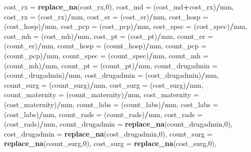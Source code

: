 \documentclass[]{article}
\newenvironment{Shaded}{\begin{snugshade}}{\end{snugshade}}
\newcommand{\KeywordTok}[1]{\textcolor[rgb]{0.13,0.29,0.53}{\textbf{#1}}}
\newcommand{\DataTypeTok}[1]{\textcolor[rgb]{0.13,0.29,0.53}{#1}}
\newcommand{\DecValTok}[1]{\textcolor[rgb]{0.00,0.00,0.81}{#1}}
\newcommand{\OperatorTok}[1]{\textcolor[rgb]{0.81,0.36,0.00}{\textbf{#1}}}
\newcommand{\NormalTok}[1]{#1}
\begin{document}
\begin{Shaded}
\begin{Highlighting}[]
{{{{{{       \DataTypeTok{cost_rx =} \KeywordTok{replace_na}\NormalTok{(cost_rx,}\DecValTok{0}\NormalTok{),}
       \DataTypeTok{cost_md =}\NormalTok{ (cost_md}\OperatorTok{+}\NormalTok{cost_rx)}\OperatorTok{/}\NormalTok{mm,}
       \DataTypeTok{cost_rx =}\NormalTok{ (cost_rx)}\OperatorTok{/}\NormalTok{mm, }
       \DataTypeTok{cost_er =}\NormalTok{ (cost_er)}\OperatorTok{/}\NormalTok{mm,}
       \DataTypeTok{cost_hosp =}\NormalTok{ (cost_hosp)}\OperatorTok{/}\NormalTok{mm,}
       \DataTypeTok{cost_pcp =}\NormalTok{ (cost_pcp)}\OperatorTok{/}\NormalTok{mm,}
       \DataTypeTok{cost_spec =}\NormalTok{ (cost_spec)}\OperatorTok{/}\NormalTok{mm,}
       \DataTypeTok{cost_mh =}\NormalTok{ (cost_mh)}\OperatorTok{/}\NormalTok{mm,}
       \DataTypeTok{cost_pt =}\NormalTok{ (cost_pt)}\OperatorTok{/}\NormalTok{mm,}
       \DataTypeTok{count_er =}\NormalTok{ (count_er)}\OperatorTok{/}\NormalTok{mm,}
       \DataTypeTok{count_hosp =}\NormalTok{ (count_hosp)}\OperatorTok{/}\NormalTok{mm,}
       \DataTypeTok{count_pcp =}\NormalTok{ (count_pcp)}\OperatorTok{/}\NormalTok{mm,}
       \DataTypeTok{count_spec =}\NormalTok{ (count_spec)}\OperatorTok{/}\NormalTok{mm,}
       \DataTypeTok{count_mh =}\NormalTok{ (count_mh)}\OperatorTok{/}\NormalTok{mm,}
       \DataTypeTok{count_pt =}\NormalTok{ (count_pt)}\OperatorTok{/}\NormalTok{mm,}
       \DataTypeTok{count_drugadmin =}\NormalTok{ (count_drugadmin)}\OperatorTok{/}\NormalTok{mm,}
       \DataTypeTok{cost_drugadmin =}\NormalTok{ (cost_drugadmin)}\OperatorTok{/}\NormalTok{mm,}
       \DataTypeTok{count_surg =}\NormalTok{ (count_surg)}\OperatorTok{/}\NormalTok{mm,}
       \DataTypeTok{cost_surg =}\NormalTok{ (cost_surg)}\OperatorTok{/}\NormalTok{mm,}
       \DataTypeTok{count_maternity =}\NormalTok{ (count_maternity)}\OperatorTok{/}\NormalTok{mm,}
       \DataTypeTok{cost_maternity =}\NormalTok{ (cost_maternity)}\OperatorTok{/}\NormalTok{mm,}
       \DataTypeTok{count_labs =}\NormalTok{ (count_labs)}\OperatorTok{/}\NormalTok{mm,}
       \DataTypeTok{cost_labs =}\NormalTok{ (cost_labs)}\OperatorTok{/}\NormalTok{mm,}
       \DataTypeTok{count_rads =}\NormalTok{ (count_rads)}\OperatorTok{/}\NormalTok{mm,}
       \DataTypeTok{cost_rads =}\NormalTok{ (cost_rads)}\OperatorTok{/}\NormalTok{mm,}
       \DataTypeTok{count_drugadmin =} \KeywordTok{replace_na}\NormalTok{(count_drugadmin,}\DecValTok{0}\NormalTok{),}
       \DataTypeTok{cost_drugadmin =} \KeywordTok{replace_na}\NormalTok{(cost_drugadmin,}\DecValTok{0}\NormalTok{),}
       \DataTypeTok{count_surg =} \KeywordTok{replace_na}\NormalTok{(count_surg,}\DecValTok{0}\NormalTok{),}
       \DataTypeTok{cost_surg =} \KeywordTok{replace_na}\NormalTok{(cost_surg,}\DecValTok{0}\NormalTok{),}
}}}}}}
\end{Highlighting}
\end{Shaded}
\end{document}

